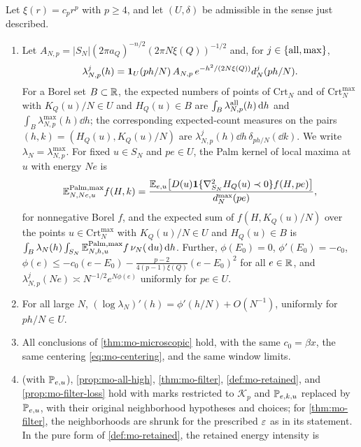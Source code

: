 \begin{proposition}\label{prop:mo-pure}
Let $\xi(r)=c_pr^p$ with $p\ge4$, and let $(U,\delta)$ be admissible in the sense just described.
\begin{enumerate}
\item[(a)] Let $A_{N,p}=|S_N|(2\pi a_Q)^{-n/2}(2\pi N\xi(Q))^{-1/2}$ and, for $j\in\{{\rm all},\max\}$,
\begin{equation}\label{eq:mo-pure-intensity}
\lambda_{N,p}^j(h)=\mathbf 1_U(ph/N)\,A_{N,p}\,e^{-h^2/(2N\xi(Q))}d_N^j(ph/N).
\end{equation}
For a Borel set $B\subset\mathbb R$, the expected numbers of points of $\mathrm{Crt}_N$ and of $\mathrm{Crt}_N^{\max}$ with $K_Q(u)/N\in U$ and $H_Q(u)\in B$ are $\int_B\lambda_{N,p}^{\rm all}(h)\,\mathrm d h$ and $\int_B\lambda_{N,p}^{\max}(h)\dd h$; the corresponding expected-count measures on the pairs $(h,k)=(H_Q(u),K_Q(u)/N)$ are $\lambda_{N,p}^j(h)\dd h\,\delta_{ph/N}(\dd k)$. We write $\lambda_N=\lambda_{N,p}^{\max}$. For fixed $u\in S_N$ and $pe\in U$, the Palm kernel of local maxima at $u$ with energy $Ne$ is
\begin{equation}\label{eq:mo-pure-palm}
\mathbb E^{\mathrm{Palm},\max}_{N,Ne,u}f(H,k)=\frac{\mathbb E_{e,u}\bigl[D(u)\mathbf 1\{\nabla_{S_N}^2H_Q(u)\prec0\}f(H,pe)\bigr]}{d_N^{\max}(pe)},
\end{equation}
for nonnegative Borel $f$, and the expected sum of $f(H,K_Q(u)/N)$ over the points $u\in\mathrm{Crt}_N^{\max}$ with $K_Q(u)/N\in U$ and $H_Q(u)\in B$ is $\int_B\lambda_N(h)\int_{S_N}\mathbb E^{\mathrm{Palm},\max}_{N,h,u}f\,\nu_N(\,\mathrm d u)\,\mathrm d h$. Further, $\phi(E_0)=0$, $\phi'(E_0)=-c_0$, $\phi(e)\le-c_0(e-E_0)-\frac{p-2}{4(p-1)\xi(Q)}(e-E_0)^2$ for all $e\in\mathbb R$, and $\lambda_{N,p}^j(Ne)\asymp N^{-1/2}e^{N\phi(e)}$ uniformly for $pe\in U$.
\item[(b)] For all large $N$, $(\log\lambda_N)'(h)=\phi'(h/N)+O(N^{-1})$, uniformly for $ph/N\in U$.
\item[(c)] All conclusions of \cref{thm:mo-microscopic} hold, with the same $c_0=\beta x$, the same centering \eqref{eq:mo-centering}, and the same window limits.
\item[(d)]  (with $\mathbb P_{e,u}$), \cref{prop:mo-all-high}, \cref{thm:mo-filter}, \cref{def:mo-retained}, and \cref{prop:mo-filter-loss} hold with marks restricted to $\mathcal K_p$ and $\mathbb P_{e,k,u}$ replaced by $\mathbb P_{e,u}$, with their original neighborhood hypotheses and choices; for \cref{thm:mo-filter}, the neighborhoods are shrunk for the prescribed $\varepsilon$ as in its statement. In the pure form of \cref{def:mo-retained}, the retained energy intensity is

\end{enumerate}
\end{proposition}

